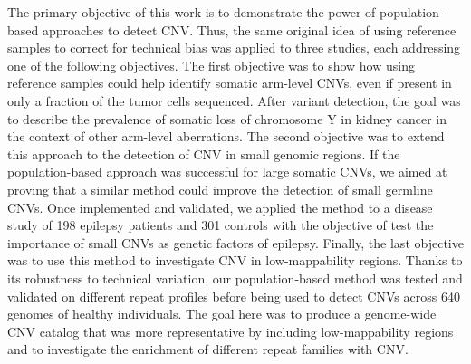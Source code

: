 The primary objective of this work is to demonstrate the power of population-based approaches to detect CNV.
Thus, the same original idea of using reference samples to correct for technical bias was applied to three studies, each addressing one of the following objectives.
The first objective was to show how using reference samples could help identify somatic arm-level CNVs, even if present in only a fraction of the tumor cells sequenced.
After variant detection, the goal was to describe the prevalence of somatic loss of chromosome Y in kidney cancer in the context of other arm-level aberrations.
The second objective was to extend this approach to the detection of CNV in small genomic regions.
If the population-based approach was successful for large somatic CNVs, we aimed at proving that a similar method could improve the detection of small germline CNVs.
Once implemented and validated, we applied the method to a disease study of 198 epilepsy patients and 301 controls with the objective of test the importance of small CNVs as genetic factors of epilepsy.
Finally, the last objective was to use this method to investigate CNV in low-mappability regions.
Thanks to its robustness to technical variation, our population-based method was tested and validated on different repeat profiles before being used to detect CNVs across 640 genomes of healthy individuals.
The goal here was to produce a genome-wide CNV catalog that was more representative by including low-mappability regions and to investigate the enrichment of different repeat families with CNV.


